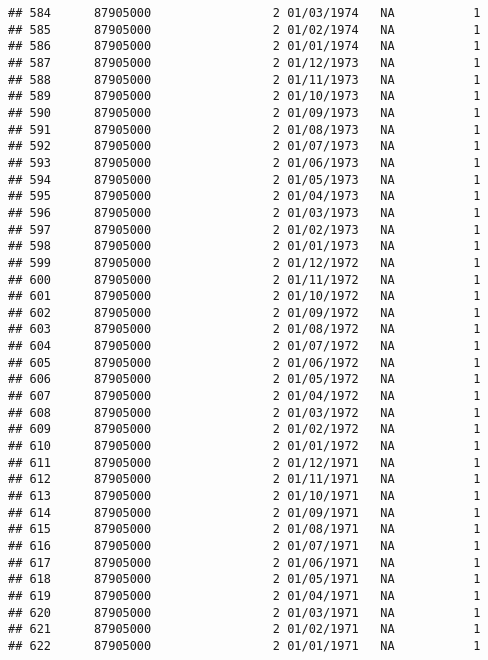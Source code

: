 \documentclass[
]{article}
\begin{document}
\begin{verbatim}
## 584      87905000                 2 01/03/1974   NA           1
## 585      87905000                 2 01/02/1974   NA           1
## 586      87905000                 2 01/01/1974   NA           1
## 587      87905000                 2 01/12/1973   NA           1
## 588      87905000                 2 01/11/1973   NA           1
## 589      87905000                 2 01/10/1973   NA           1
## 590      87905000                 2 01/09/1973   NA           1
## 591      87905000                 2 01/08/1973   NA           1
## 592      87905000                 2 01/07/1973   NA           1
## 593      87905000                 2 01/06/1973   NA           1
## 594      87905000                 2 01/05/1973   NA           1
## 595      87905000                 2 01/04/1973   NA           1
## 596      87905000                 2 01/03/1973   NA           1
## 597      87905000                 2 01/02/1973   NA           1
## 598      87905000                 2 01/01/1973   NA           1
## 599      87905000                 2 01/12/1972   NA           1
## 600      87905000                 2 01/11/1972   NA           1
## 601      87905000                 2 01/10/1972   NA           1
## 602      87905000                 2 01/09/1972   NA           1
## 603      87905000                 2 01/08/1972   NA           1
## 604      87905000                 2 01/07/1972   NA           1
## 605      87905000                 2 01/06/1972   NA           1
## 606      87905000                 2 01/05/1972   NA           1
## 607      87905000                 2 01/04/1972   NA           1
## 608      87905000                 2 01/03/1972   NA           1
## 609      87905000                 2 01/02/1972   NA           1
## 610      87905000                 2 01/01/1972   NA           1
## 611      87905000                 2 01/12/1971   NA           1
## 612      87905000                 2 01/11/1971   NA           1
## 613      87905000                 2 01/10/1971   NA           1
## 614      87905000                 2 01/09/1971   NA           1
## 615      87905000                 2 01/08/1971   NA           1
## 616      87905000                 2 01/07/1971   NA           1
## 617      87905000                 2 01/06/1971   NA           1
## 618      87905000                 2 01/05/1971   NA           1
## 619      87905000                 2 01/04/1971   NA           1
## 620      87905000                 2 01/03/1971   NA           1
## 621      87905000                 2 01/02/1971   NA           1
## 622      87905000                 2 01/01/1971   NA           1

\end{verbatim}
\end{document}
